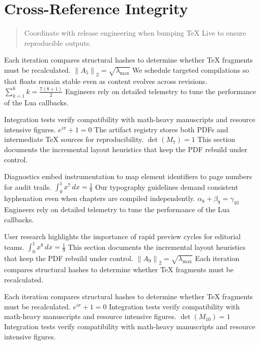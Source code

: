     \section{Cross-Reference Integrity}
    
    \begin{quote}
      Coordinate with release engineering when bumping TeX Live to ensure reproducible outputs.
    \end{quote}
  
    Each iteration compares structural hashes to determine whether TeX fragments must be recalculated.  $\left\|A_{5}\right\|_{2} = \sqrt{\lambda_{\max}}$  We schedule targeted compilations so that floats remain stable even as content evolves across revisions.  $\sum_{k=1}^{6} k = \frac{7(8+1)}{2}$  Engineers rely on detailed telemetry to tune the performance of the Lua callbacks.
    \par
  
    Integration tests verify compatibility with math-heavy manuscripts and resource intensive figures.  $e^{i\pi} + 1 = 0$  The artifact registry stores both PDFs and intermediate TeX sources for reproducibility.  $\det(M_{7}) = 1$  This section documents the incremental layout heuristics that keep the PDF rebuild under control.
    \par
  
    Diagnostics embed instrumentation to map element identifiers to page numbers for audit trails.  $\int_{0}^{1} x^{7} \, dx = \frac{1}{8}$  Our typography guidelines demand consistent hyphenation even when chapters are compiled independently.  $\alpha_{8} + \beta_{9} = \gamma_{10}$  Engineers rely on detailed telemetry to tune the performance of the Lua callbacks.
    \par
  
    User research highlights the importance of rapid preview cycles for editorial teams.  $\int_{0}^{1} x^{8} \, dx = \frac{1}{9}$  This section documents the incremental layout heuristics that keep the PDF rebuild under control.  $\left\|A_{9}\right\|_{2} = \sqrt{\lambda_{\max}}$  Each iteration compares structural hashes to determine whether TeX fragments must be recalculated.
    \par
  
    Each iteration compares structural hashes to determine whether TeX fragments must be recalculated.  $e^{i\pi} + 1 = 0$  Integration tests verify compatibility with math-heavy manuscripts and resource intensive figures.  $\det(M_{10}) = 1$  Integration tests verify compatibility with math-heavy manuscripts and resource intensive figures.
    \par
  
